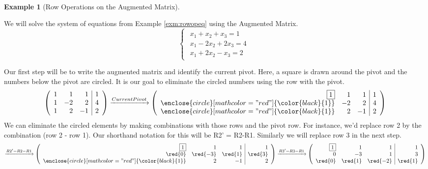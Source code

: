 \documentclass[
]{article}
\theoremstyle{definition}
\theoremstyle{definition}
\newtheorem{example}{Example}[section]
\theoremstyle{definition}
\theoremstyle{definition}
\theoremstyle{remark}
\begin{document}
\begin{example}[Row Operations on the Augmented Matrix]
\protect\hypertarget{exm:rowopmat}{}\label{exm:rowopmat}

We will solve the system of equations from Example \ref{exm:rowopeq} using the Augmented Matrix.
\begin{equation*}\begin{cases}\begin{align}
x_1+x_2 +x_3= 1\\
x_1-2x_2+2x_3 =4\\
x_1+2x_2-x_3 = 2\end{align}\end{cases}
\end{equation*}

Our first step will be to write the augmented matrix and identify the current pivot. Here, a square is drawn around the pivot and the numbers below the pivot are circled. It is our goal to eliminate the circled numbers using the row with the pivot.
\begin{equation*}
\left(\begin{array}{rrr|r}
 1 & 1 & 1 & 1\\
 1 & -2 & 2 &4\\
 1&2&-1 &2
\end{array}\right)
 \xrightarrow{Current Pivot}\left(\begin{array}{rrr|r}
 \fbox{1} & 1 & 1 & 1\\
\enclose{circle}[mathcolor="red"]{\color{black}{1}} & -2 & 2 &4\\
 \enclose{circle}[mathcolor="red"]{\color{black}{1}}&2&-1 &2
\end{array}\right)
\end{equation*}
We can eliminate the circled elements by making combinations with those rows and the pivot row. For instance, we'd replace row 2 by the combination (row 2 - row 1). Our shorthand notation for this will be R2' = R2-R1. Similarly we will replace row 3 in the next step.
\begin{equation*}
\xrightarrow{R2'=R2-R1}
  \left(\begin{array}{rrr|r}
 \fbox{1} & 1 & 1 & 1\\
\red{0} & \red{-3} & \red{1} &\red{3}\\
 \enclose{circle}[mathcolor="red"]{\color{black}{1}}&2&-1 &2
\end{array}\right)
 \xrightarrow{R3'=R3-R1} \left(\begin{array}{rrr|r}
 \fbox{1} & 1 & 1 & 1\\
0 & -3 & 1 &3\\
\red{0}&\red{1}&\red{-2}&\red{1}
\end{array}\right)
\end{equation*}


\end{example}
\end{document}

